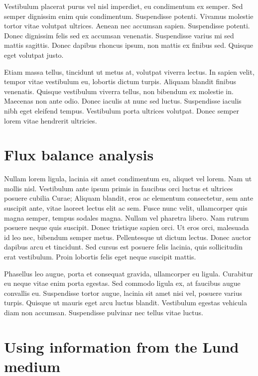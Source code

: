 \documentclass[parskip=full]{scrreprt}
\begin{document}
Vestibulum placerat purus vel nisl imperdiet, eu condimentum ex semper. Sed semper dignissim enim quis condimentum. Suspendisse potenti. Vivamus molestie tortor vitae volutpat ultrices. Aenean nec accumsan sapien. Suspendisse potenti. Donec dignissim felis sed ex accumsan venenatis. Suspendisse varius mi sed mattis sagittis. Donec dapibus rhoncus ipsum, non mattis ex finibus sed. Quisque eget volutpat justo.

Etiam massa tellus, tincidunt ut metus at, volutpat viverra lectus. In sapien velit, tempor vitae vestibulum eu, lobortis dictum turpis. Aliquam blandit finibus venenatis. Quisque vestibulum viverra tellus, non bibendum ex molestie in. Maecenas non ante odio. Donec iaculis at nunc sed luctus. Suspendisse iaculis nibh eget eleifend tempus. Vestibulum porta ultrices volutpat. Donec semper lorem vitae hendrerit ultricies.

\section{Flux balance analysis}
\label{sec:fba}

Nullam lorem ligula, lacinia sit amet condimentum eu, aliquet vel lorem. Nam ut mollis nisl. Vestibulum ante ipsum primis in faucibus orci luctus et ultrices posuere cubilia Curae; Aliquam blandit, eros ac elementum consectetur, sem ante suscipit ante, vitae laoreet lectus elit ac sem. Fusce nunc velit, ullamcorper quis magna semper, tempus sodales magna. Nullam vel pharetra libero. Nam rutrum posuere neque quis suscipit. Donec tristique sapien orci. Ut eros orci, malesuada id leo nec, bibendum semper metus. Pellentesque ut dictum lectus. Donec auctor dapibus arcu et tincidunt. Sed cursus est posuere felis lacinia, quis sollicitudin erat vestibulum. Proin lobortis felis eget neque suscipit mattis.

Phasellus leo augue, porta et consequat gravida, ullamcorper eu ligula. Curabitur eu neque vitae enim porta egestas. Sed commodo ligula ex, at faucibus augue convallis eu. Suspendisse tortor augue, lacinia sit amet nisi vel, posuere varius turpis. Quisque ut mauris eget arcu luctus blandit. Vestibulum egestas vehicula diam non accumsan. Suspendisse pulvinar nec tellus vitae luctus.

\section{Using information from the Lund medium}
\label{sec:lund}
\end{document}

